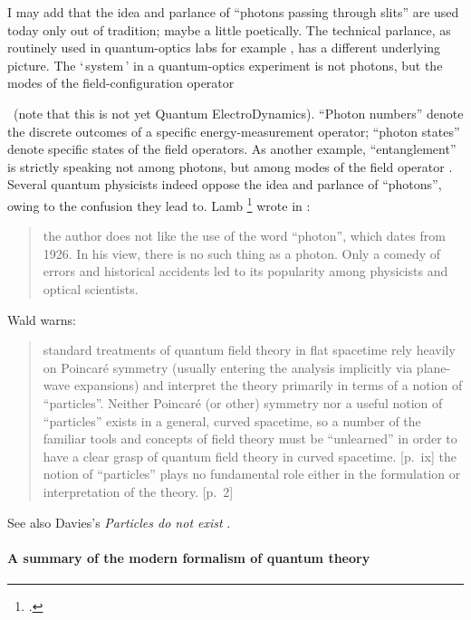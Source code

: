 \documentclass[\ifafour a4paper,12pt,\else a5paper,10pt,\fi%
onecolumn,oneside,article,%
british%
]{memoir}
\newcommand*{\defquote}[1]{`\,#1\,'}
\theoremstyle{remark}
\theoremstyle{innote}
\newcommand*{\citep}{\parencites}%
\newcommand*{\citey}{\parencites*}
\newcommand*{\ibid}{\unspace\addtocounter{footnote}{-1}\footnotemark{}}
\renewcommand*{\|}[1][]{\nonscript\,#1\vert\nonscript\;\mathopen{}}
\begin{document}
I may add that the idea and parlance of \enquote{photons passing through
  slits} are used today only out of tradition; maybe a little poetically.
The technical parlance, as routinely used in quantum-optics labs for
example \citep{leonhardt1997,gerryetal2005}, has a different
underlying picture. The \defquote{system} in a quantum-optics experiment is
not photons, but the modes of the field-configuration operator\ibid\ (note
that this is not yet Quantum ElectroDynamics). \enquote{Photon numbers}
denote the discrete outcomes of a specific energy-measurement operator;
\enquote{photon states} denote specific states of the field operators. As
another example, \enquote{entanglement} is strictly speaking not among
photons, but among modes of the field operator \citep{vanenk2003b}. Several
quantum physicists indeed oppose the idea and parlance of
\enquote{photons}, owing to the confusion they lead to. Lamb \footcite[of the
Lamb shift,][]{lambetal1947} wrote in \cite*{lamb1995}:
\begin{quote}
  \footnotesize the author does not like the use of the word ``photon'',
  which dates from 1926. In his view, there is no such thing as a photon.
  Only a comedy of errors and historical accidents led to its popularity
  among physicists and optical scientists.
\end{quote}
Wald \citey{wald1994} warns:
\begin{quote}
  \footnotesize standard treatments of quantum field theory in flat
  spacetime rely heavily on Poincar\'e symmetry (usually entering the
  analysis implicitly via plane-wave expansions) and interpret the theory
  primarily in terms of a notion of ``particles''. Neither Poincar\'e (or
  other) symmetry nor a useful notion of ``particles'' exists in a general,
  curved spacetime, so a number of the familiar tools and concepts of field
  theory must be ``unlearned'' in order to have a clear grasp of quantum
  field theory in curved spacetime. [p.~ix] \textelp{} the notion of
  ``particles'' plays no fundamental role either in the formulation or
  interpretation of the theory. [p.~2]
\end{quote}
See also Davies's \emph{Particles do not exist} \citey{davies1984}.

\bigskip

\paragraph{A summary of the modern formalism of quantum theory}
\end{document}
